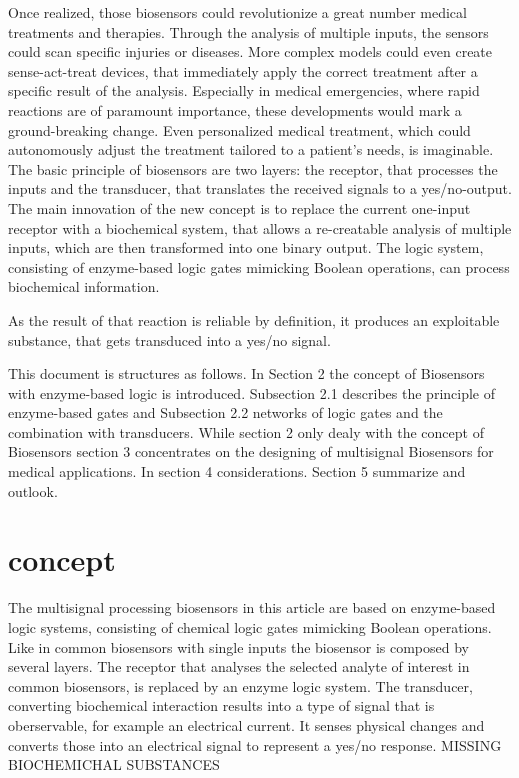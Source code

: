 \documentclass[runningheads]{llncs}
\begin{document}
	Once realized, those biosensors could revolutionize a great number medical treatments and therapies. Through the analysis of multiple inputs, the sensors could scan specific injuries or diseases. More complex models could even create sense-act-treat devices, that immediately apply the correct treatment after a specific result of the analysis. Especially in medical emergencies, where rapid reactions are of paramount importance, these developments would mark a ground-breaking change. Even personalized medical treatment, which could autonomously adjust the treatment tailored to a patient’s needs, is imaginable.\\
	
	
	The basic principle of biosensors are two layers: the receptor, that processes the inputs and the transducer, that translates the received signals to a yes/no-output. The main innovation of the new concept is to replace the current one-input receptor with a biochemical system, that allows a re-creatable analysis of multiple inputs, which are then transformed into one binary output. The logic system, consisting of enzyme-based logic gates mimicking Boolean operations, can process biochemical information.
	 
	 As the result of that reaction is reliable by definition, it produces an exploitable substance, that gets transduced into a yes/no signal.
	

	This document is structures as follows. In Section 2 the concept of Biosensors with enzyme-based logic is introduced. Subsection 2.1 describes the principle of enzyme-based gates and Subsection 2.2 networks of logic gates and the combination with transducers. While section 2 only dealy with the concept of Biosensors section 3 concentrates on the designing of multisignal Biosensors for medical applications.
	In section 4 considerations. Section 5 summarize and outlook. 
	
	
	
	
	
\section{concept}

The multisignal processing biosensors in this article are based on enzyme-based logic systems, consisting of chemical logic gates mimicking Boolean operations. Like in common biosensors with single inputs the biosensor is composed by several layers. The receptor that analyses the selected analyte of interest in common biosensors, is replaced by an enzyme logic system.
The transducer, converting biochemical interaction results into a type of signal that is oberservable, for example an electrical current. It senses physical changes and converts those into an electrical signal to represent a yes/no response.
MISSING BIOCHEMICHAL SUBSTANCES
\end{document}

